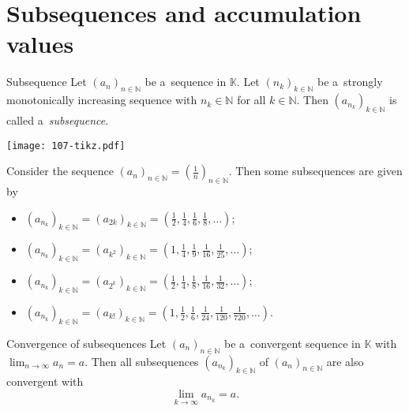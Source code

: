 

\section{Subsequences and accumulation values}
\begin{Definition}{Subsequence}
Let $(a_n)_{n\in\mathbb{N}}$ be a~sequence in $\mathbb{K}$. Let $(n_k)_{k\in\mathbb{N}}$ be a~strongly monotonically increasing sequence with $n_k\in\mathbb{N}$ for all $k\in\mathbb{N}$. Then
$(a_{n_k})_{k\in\mathbb{N}}$ is called a~{\em subsequence}.
\end{Definition}

\begin{center}
  \texttt{[image: 107-tikz.pdf]}
\end{center}

\begin{example}
Consider the sequence $(a_n)_{n\in\mathbb{N}}=(\frac1n)_{n\in\mathbb{N}}$. Then some subsequences are given by
\begin{itemize}
 \item $(a_{n_k})_{k\in\mathbb{N}}=(a_{2k})_{k\in\mathbb{N}}=(\frac12,\frac14,\frac16,\frac18,\ldots)$;
 \item $(a_{n_k})_{k\in\mathbb{N}}=(a_{k^2})_{k\in\mathbb{N}}=(1,\frac14,\frac19,\frac1{16},\frac1{25},\ldots)$;
 \item $(a_{n_k})_{k\in\mathbb{N}}=(a_{2^k})_{k\in\mathbb{N}}=(\frac12,\frac14,\frac18,\frac1{16},\frac1{32},\ldots)$;
 \item $(a_{n_k})_{k\in\mathbb{N}}=(a_{k!})_{k\in\mathbb{N}}=(1,\frac12,\frac16,\frac1{24},\frac1{120},\frac1{720},\ldots)$.
\end{itemize}
\end{example}

\begin{Theorem}{Convergence of subsequences}\label{thm:convsubseq}
Let $(a_n)_{n\in\mathbb{N}}$ be a~convergent sequence in $\mathbb{K}$ with $\lim_{n\to\infty}a_n=a$. Then all subsequences $(a_{n_k})_{k\in\mathbb{N}}$ of $(a_n)_{n\in\mathbb{N}}$ are also convergent with
\[\lim_{k\to\infty}a_{n_k}=a.\]
\end{Theorem}

